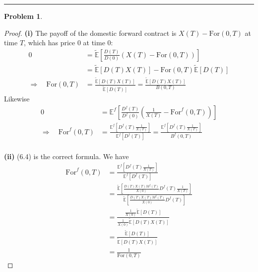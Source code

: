 \documentclass[a4paper, 10pt]{article}
\theoremstyle{definition}
\newtheorem{problem}{Problem}
\theoremstyle{hSol}
\begin{document}
\noindent\rule{16cm}{0.4pt}
\begin{problem} 
\end{problem}
\begin{proof} \textbf{(i)} The payoff of the domestic forward contract is $X(T)-\text{For}(0,T)$ at time $T$, which has price $0$ at time $0$:
\begin{equation}
  \begin{split}
    0 &= \widetilde{\mathbb{E}}\left[\frac{D(T)}{D(0)}\left(X(T) - \text{For}(0,T)\right)\right] \\
    &=\widetilde{\mathbb{E}}\left[D(T)X(T)\right] - \text{For}(0,T)\widetilde{\mathbb{E}}\left[D(T)\right] \\
    \Rightarrow \quad \text{For}(0,T) & = \frac{\widetilde{\mathbb{E}}\left[D(T)X(T)\right]}{\widetilde{\mathbb{E}}\left[D(T)\right]}= \frac{\widetilde{\mathbb{E}}\left[D(T)X(T)\right]}{B(0,T)}
  \end{split}
\end{equation}
Likewise
\begin{equation}
  \begin{split}
    0 &= \mathbb{E}^f\left[\frac{D^f(T)}{D^f(0)}\left(\frac{1}{X(T)} - \text{For}^f(0,T)\right)\right] \\
    \Rightarrow \quad \text{For}^f(0,T) & = \frac{\mathbb{E}^f\left[D^f(T)\frac{1}{X(T)}\right]}{\mathbb{E}^f\left[D^f(T)\right]}= \frac{\mathbb{E}^f\left[D^f(T)\frac{1}{X(T)}\right]}{B^f(0,T)}
  \end{split}
\end{equation}
~\\
\textbf{(ii)} (6.4) is the correct formula. We have
\begin{equation}
  \begin{split}
    \text{For}^f(0,T) & = \frac{\mathbb{E}^f\left[D^f(T)\frac{1}{X(T)}\right]}{\mathbb{E}^f\left[D^f(T)\right]} \\
    &=  \frac{\widetilde{\mathbb{E}}\left[\frac{D(T)X(T)M^f(T)}{X(0)}D^f(T)\frac{1}{X(T)}\right]}{\widetilde{\mathbb{E}}\left[\frac{D(T)X(T)M^f(T)}{X(0)}D^f(T)\right]}\\
    &=  \frac{\frac{1}{X(0)}\widetilde{\mathbb{E}}\left[D(T)\right]}{\frac{1}{X(0)}\widetilde{\mathbb{E}}\left[D(T)X(T)\right]}\\
    &=\frac{\widetilde{\mathbb{E}}\left[D(T)\right]}{\widetilde{\mathbb{E}}\left[D(T)X(T)\right]} \\
    &= \frac{1}{\text{For}(0,T)}
  \end{split}

\end{equation}
\end{proof}
\end{document}
